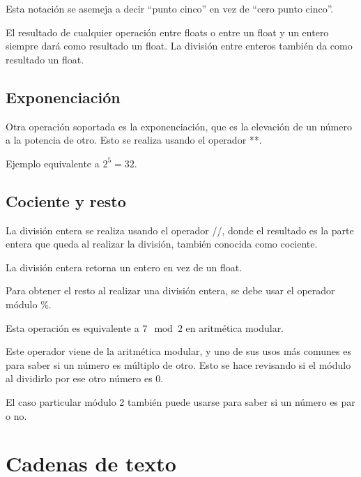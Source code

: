\documentclass{report}
\newcommand{\doble}[1]{``#1''}
\begin{document}

Esta notación se asemeja a decir \doble{punto cinco} en vez de \doble{cero punto cinco}.

El resultado de cualquier operación entre floats o entre un float y un entero siempre dará como resultado un float. La división entre enteros también da como resultado un float.


\section{Exponenciación}

Otra operación soportada es la exponenciación, que es la elevación de un número a la potencia de otro. Esto se realiza usando el operador **.

Ejemplo equivalente a $2 ^ 5 = 32$.


\section{Cociente y resto}

La división entera se realiza usando el operador //, donde el resultado es la parte entera que queda al realizar la división, también conocida como cociente.

La división entera retorna un entero en vez de un float.


Para obtener el resto al realizar una división entera, se debe usar el operador módulo \%.


Esta operación es equivalente a $7 \mod{2}$ en aritmética modular.

Este operador viene de la aritmética modular, y uno de sus usos más comunes es para saber si un número es múltiplo de otro. Esto se hace revisando si el módulo al dividirlo por ese otro número es 0.


El caso particular módulo 2 también puede usarse para saber si un número es par o no.

\clearpage\chapter{Cadenas de texto}
\end{document}
